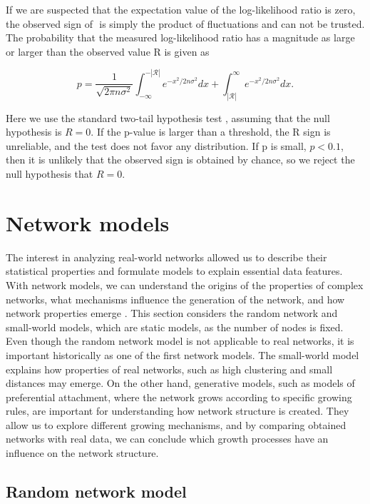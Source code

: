 If we are suspected that the expectation value of the log-likelihood ratio is zero, the observed sign of $\mathcal {} $ is simply the product of fluctuations and can not be trusted. The probability that the measured log-likelihood ratio has a magnitude as large or larger than the observed value R is given as

\begin{equation}
p = \frac{1}{\sqrt{2\pi n \sigma^2}} \int_{-\infty}^{-|\mathcal{R}|}e^{-x^2/2n\sigma^2}dx + \int_{|\mathcal{R}|}^{\infty}e^{-x^2/2n\sigma^2}dx.
\end{equation}

Here we use the standard two-tail hypothesis test \cite{clauset2009power}, assuming that the null hypothesis is  $R= 0$. If the p-value is larger than a threshold, the R sign is unreliable, and the test does not favor any distribution. If p is small, $p<0.1$, then it is unlikely that the observed sign is obtained by chance, so we reject the null hypothesis that $R=0$. 

\section{Network models}

The interest in analyzing real-world networks allowed us to describe their statistical properties and formulate models to explain essential data features. With network models, we can understand the origins of the properties of complex networks, what mechanisms influence the generation of the network, and how network properties emerge \cite{newman2010, barabasi2016network}. This section considers the random network and small-world models, which are static models, as the number of nodes is fixed. Even though the random network model is not applicable to real networks, it is important historically as one of the first network models. The small-world model explains how properties of real networks, such as high clustering and small distances may emerge. On the other hand, generative models, such as models of preferential attachment, where the network grows according to specific growing rules, are important for understanding how network structure is created. They allow us to explore different growing mechanisms, and by comparing obtained networks with real data, we can conclude which growth processes have an influence on the network structure.          

\subsection{Random network model}

